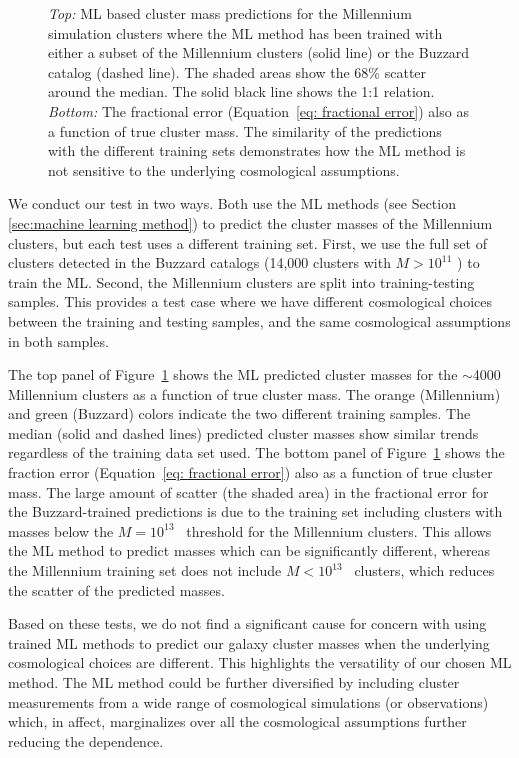 \documentclass[fleqn,usenatbib]{mnras}
\begin{document}
\begin{figure}
	\caption[ML based cluster mass predictions in the Millennium Simulation]{\emph{Top:} ML based cluster mass predictions for the Millennium simulation clusters where the ML method has been trained with either a subset of the Millennium clusters (solid line) or the Buzzard catalog (dashed line). The shaded areas show the 68\% scatter around the median. The solid black line shows the 1:1 relation. \emph{Bottom:} The fractional error (Equation~\ref{eq: fractional error}) also as a function of true cluster mass. The similarity of the predictions with the different training sets demonstrates how the ML method is not sensitive to the underlying cosmological assumptions.} \label{fig: mill buzz comparison} 
\end{figure}

We conduct our test in two ways. Both use the ML methods (see Section \ref{sec:machine learning method}) to predict the cluster masses of the Millennium clusters, but each test uses a different training set. First, we use the full set of clusters detected in the Buzzard catalogs (14,000 clusters with $M > 10^{11}$ \msol) to train the ML. Second, the Millennium clusters are split into training-testing samples. This provides a test case where we have different cosmological choices between the training and testing samples, and the same cosmological assumptions in both samples. 

The top panel of Figure~\ref{fig: mill buzz comparison} shows the ML predicted cluster masses for the $\sim$4000 Millennium clusters as a function of true cluster mass. The orange (Millennium) and green (Buzzard) colors indicate the two different training samples. The median (solid and dashed lines) predicted cluster masses show similar trends regardless of the training data set used. The bottom panel of Figure~\ref{fig: mill buzz comparison} shows the fraction error (Equation~\ref{eq: fractional error}) also as a function of true cluster mass. The large amount of scatter (the shaded area) in the fractional error for the Buzzard-trained predictions is due to the training set including clusters with masses below the $M = 10^{13}$ \Msol\ threshold for the Millennium clusters. This allows the ML method to predict masses which can be significantly different, whereas the Millennium training set does not include $M < 10^{13}$ \Msol\ clusters, which reduces the scatter of the predicted masses.

Based on these tests, we do not find a significant cause for concern with using trained ML methods to predict our galaxy cluster masses when the underlying cosmological choices are different. This highlights the versatility of our chosen ML method. The ML method could be further diversified by including cluster measurements from a wide range of cosmological simulations (or observations) which, in affect, marginalizes over all the cosmological assumptions further reducing the dependence.
\end{document}
